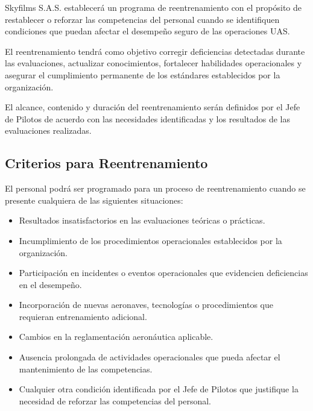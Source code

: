Skyfilms S.A.S. establecerá un programa de reentrenamiento con el propósito de restablecer o reforzar las competencias del personal cuando se identifiquen condiciones que puedan afectar el desempeño seguro de las operaciones UAS.

El reentrenamiento tendrá como objetivo corregir deficiencias detectadas durante las evaluaciones, actualizar conocimientos, fortalecer habilidades operacionales y asegurar el cumplimiento permanente de los estándares establecidos por la organización.

El alcance, contenido y duración del reentrenamiento serán definidos por el Jefe de Pilotos de acuerdo con las necesidades identificadas y los resultados de las evaluaciones realizadas.



\subsection{Criterios para Reentrenamiento}

El personal podrá ser programado para un proceso de reentrenamiento cuando se presente cualquiera de las siguientes situaciones:

\begin{itemize}

\item Resultados insatisfactorios en las evaluaciones teóricas o prácticas.

\item Incumplimiento de los procedimientos operacionales establecidos por la organización.

\item Participación en incidentes o eventos operacionales que evidencien deficiencias en el desempeño.

\item Incorporación de nuevas aeronaves, tecnologías o procedimientos que requieran entrenamiento adicional.

\item Cambios en la reglamentación aeronáutica aplicable.

\item Ausencia prolongada de actividades operacionales que pueda afectar el mantenimiento de las competencias.

\item Cualquier otra condición identificada por el Jefe de Pilotos que justifique la necesidad de reforzar las competencias del personal.

\end{itemize}



